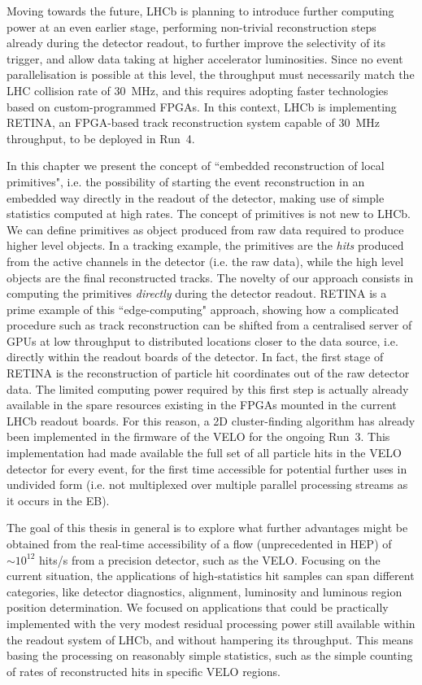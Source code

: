 Moving towards the future, LHCb is planning to introduce further computing power at an even earlier stage, performing non-trivial reconstruction steps already during the detector readout, to further improve the selectivity of its trigger, and allow data taking at higher accelerator luminosities. 
Since no event parallelisation is possible at this level, the throughput must necessarily match the LHC collision rate of \SI{30}{\mega\hertz}, and this requires adopting faster technologies based on custom-programmed FPGAs.
In this context, LHCb is implementing RETINA, an FPGA-based track reconstruction system capable of \SI{30}{\mega\hertz} throughput, to be deployed in Run~4\cite{Morello:2888549}. 

In this chapter we present the concept of ``embedded reconstruction of local primitives", i.e. the possibility of starting the event reconstruction in an embedded way directly in the readout of the detector, making use of simple statistics computed at high rates. The concept of primitives is not new to LHCb. We can define primitives as object produced from raw data required to produce higher level objects. In a tracking example, the primitives are the \textit{hits} produced from the active channels in the detector (i.e. the raw data), while the high level objects are the final reconstructed tracks. 
The novelty of our approach consists in computing the primitives \textit{directly} during the detector readout. RETINA is a prime example of this ``edge-computing"  approach, showing how a complicated procedure such as track reconstruction can be shifted from a centralised server of GPUs at low throughput to distributed locations closer to the data source, i.e. directly within the readout boards of the detector.
In fact, the first stage of RETINA is the reconstruction of particle hit coordinates out of the raw detector data. The limited computing power required by this first step is actually already available in the spare resources existing in the FPGAs mounted in the current LHCb readout boards. For this reason, a 2D cluster-finding algorithm has already been implemented in the firmware of the VELO for the ongoing Run~3.
This implementation had made available the full set of all particle hits in the VELO detector for every event, for the first time accessible for potential further uses in undivided form (i.e. not multiplexed over multiple parallel processing streams as it occurs in the EB).

The goal of this thesis in general is to explore what further advantages might be obtained from the real-time accessibility of a flow (unprecedented in HEP) of $\sim 10^{12}$ hits/s from a precision detector, such as the VELO. Focusing on the current situation, the applications of high-statistics hit samples can span different categories, like detector diagnostics, alignment, luminosity and luminous region position determination. 
We focused on applications that could be practically implemented with the very modest residual processing power still available within the readout system of LHCb, and without hampering its throughput. This means basing the processing on reasonably simple statistics, such as the simple counting of rates of reconstructed hits in specific VELO regions.

